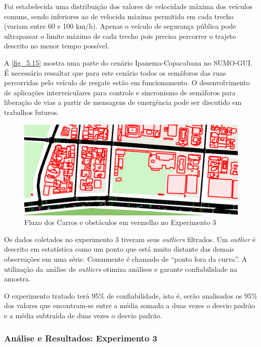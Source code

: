 \documentclass[
12pt,				%
openright,			%
oneside,			%
a4paper,			%
brazil,				%
]{abntex2}
\begin{document}
	\par Foi estabelecida uma distribuição dos valores de velocidade máxima dos veículos comuns, sendo inferiores ao de velocida máxima permitida em cada trecho (variam entre 60 e 100 km/h). Apenas o veículo de segurança pública pode ultrapassar o limite máximo de cada trecho pois precisa percorrer o trajeto descrito no menor tempo possível.
	
	\par A \autoref{fig_5.15} mostra uma parte do cenário Ipanema-Copacabana no SUMO-GUI. É necessário ressaltar que para este cenário todos os semáforos das ruas percorridas pelo veículo de resgate estão em funcionamento. O desenvolvimento de aplicações interveiculares para controle e sincronismo de semáforos para liberação de vias a partir de mensagens de emergência pode ser discutido em trabalhos futuros.
	
	\begin{figure}[H]
		\centering
		\includegraphics[scale=.34]{figuras/cap5/515Cenario3SUMO}
		\caption{\label{fig_5.15}Fluxo dos Carros e obstáculos em vermelho no  Experimento 3}
	\end{figure}
	
	\par Os dados coletados no experimento 3 tiveram seus \textit{outliers} filtrados. Um \textit{outlier} é descrito em estatística como um ponto que está muito distante das demais observações em uma série. Comumente é chamado de “ponto fora da curva”. A utilização da análise de \textit{outliers} otimiza análises e garante confiabilidade na amostra.
	
	\par O experimento tratado terá 95\% de confiabilidade, isto é, serão analisados os 95\% dos valores que encontram-se entre a média somada a duas vezes o desvio padrão e a média subtraída de duas vezes o desvio padrão.
	
	\subsubsection{Análise e Resultados: Experimento 3}
	
\end{document}
